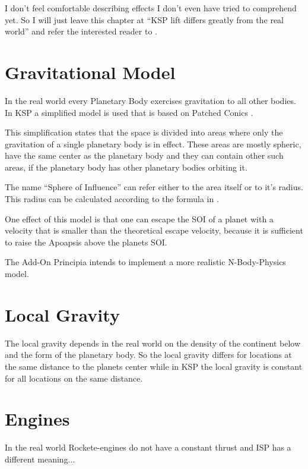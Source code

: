 \documentclass[11pt]{report}
\begin{document}
I don't feel comfortable describing effects I don't even have tried to
comprehend yet. So I will just leave this chapter at ``KSP lift
differs greatly from the real world'' and refer the interested reader
to \cite{FAR}.

\section{Gravitational Model}

In the real world every Planetary Body exercises gravitation to all
other bodies.  In KSP a simplified model is used that is based on
Patched Conics  \cite{PatchedConics}.

This simplification states that the space is divided into areas where
only the gravitation of a single planetary body is in effect.  These
areas are mostly spheric, have the same center as the planetary body
and they can contain other such areas, if the planetary body has other
planetary bodies orbiting it.

The name ``Sphere of Influence''  can refer
either to the area itself or to it's radius. This radius can be
calculated according to the formula in \cite{SphereOfInfluence}.

One effect of this model is that one can escape the SOI of a planet
with a velocity that is smaller than the theoretical escape velocity,
 because it is sufficient to raise the Apoapsis
above the planets SOI.

The Add-On Principia \cite{principia} intends to implement a more
realistic N-Body-Physics  model.

\section{Local Gravity}

The local gravity depends in the real world on the density of the
continent below and the form of the planetary body. So the local
gravity differs for locations at the same distance to the planets
center while in KSP the local gravity is constant for all locations on
the same distance.

\section{Engines}

In the real world Rockete-engines do not have a constant thrust and
ISP has a different meaning...
\end{document}
